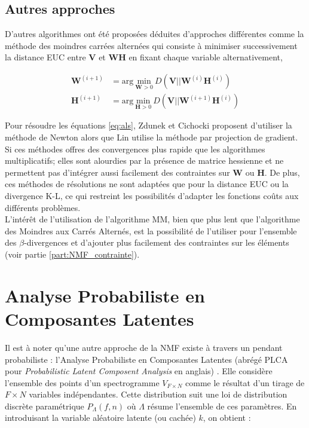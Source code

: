 \subsection{Autres approches}

D'autres algorithmes ont été proposées déduites d'approches différentes comme la méthode des moindres carrées alternées \cite{cichocki_regularized_2007, berry_algorithms_2007} qui consiste à minimiser successivement la distance EUC entre $\mathbf{V}$ et $\mathbf{WH}$ en fixant chaque variable alternativement, 

\begin{subequations}\label{eq:als}
\begin{align}
\mathbf{W}^{(i+1)} &= \text{arg}~\underset{\mathbf{W} > 0}{\text{min}}~D\left(\mathbf{V} \vert\vert\mathbf{W}^{(i)}\mathbf{H}^{(i)}\right)\\
\mathbf{H}^{(i+1)} &= \text{arg}~\underset{\mathbf{H} > 0}{\text{min}}~D\left(\mathbf{V} \vert\vert\mathbf{W}^{(i+1)}\mathbf{H}^{(i)}\right)
\end{align}
\end{subequations}

Pour résoudre les équations \ref{eq:als}, Zdunek et Cichocki \cite{zdunek2006non} proposent d'utiliser la méthode de Newton alors que Lin \cite{lin_projected_2007} utilise la méthode par projection de gradient. Si ces méthodes offres des convergences plus rapide que les algorithmes multiplicatifs; elles sont alourdies par la présence de matrice hessienne et ne permettent pas d'intégrer aussi facilement des contraintes sur $\mathbf{W}$ ou $\mathbf{H}$. De plus, ces méthodes de résolutions ne sont adaptées que pour la distance EUC ou la divergence K-L, ce qui restreint les possibilités d'adapter les fonctions coûts aux différents problèmes.\\

L'intérêt de l'utilisation de l'algorithme MM, bien que plus lent que l'algorithme des Moindres aux Carrés Alternés, est la possibilité de l'utiliser pour l'ensemble des $\beta$-divergences et d'ajouter plus facilement des contraintes sur les éléments (voir partie \ref{part:NMF_contrainte}).


\section{Analyse Probabiliste en Composantes Latentes}

Il est à noter qu'une autre approche de la NMF existe à travers un pendant probabiliste : l'Analyse Probabiliste en Composantes Latentes (abrégé PLCA pour \textit{Probabilistic Latent Composent Analysis} en anglais) \cite{hofmann_unsupervised_2001, cazau_understanding_2017}. Elle considère l'ensemble des points d'un spectrogramme $V_{F \times N}$ comme le résultat d'un tirage de $F \times N$ variables indépendantes.  Cette distribution suit une loi de distribution discrète paramétrique $P_{\Lambda}\left(f,n\right)$ où $\Lambda$ résume l'ensemble de ces paramètres. En introduisant la variable aléatoire latente (ou cachée) $k$, on obtient :  

